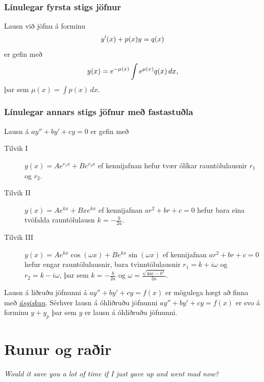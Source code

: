 \documentclass[b5paper,10pt,icelandic]{sphinxmanual}
\begin{document}
\subsection{Línulegar fyrsta stigs jöfnur}
\label{kafli08:linulegar-fyrsta-stigs-jofnur}
Lausn við jöfnu á forminu
\begin{gather}
\begin{split}y'(x) + p(x)y = q(x)\end{split}\notag
\end{gather}
er gefin með
\begin{gather}
\begin{split}y(x) = e^{-\mu(x)} \int e^{\mu(x)} q(x)\, dx,\end{split}\notag
\end{gather}
þar sem \(\mu(x) = \int p(x)\, dx\).


\subsection{Línulegar annars stigs jöfnur með fastastuðla}
\label{kafli08:linulegar-annars-stigs-jofnur-me-fastastula}
Lausn á \(ay''+by'+cy=0\) er gefin með
\begin{description}
\item[{Tilvik I}] \leavevmode
\(y(x)=Ae^{r_1x}+Be^{r_2x}\)
ef kennijafnan hefur tvær ólíkar rauntölulausnir \(r_1\) og
\(r_2\).

\item[{Tilvik II}] \leavevmode
\(y(x)=Ae^{kx}+Bxe^{kx}\)
ef kennijafnan \(ar^2+br+c=0\) hefur bara eina tvöfalda rauntölulausn
\(k=-\frac{b}{2a}\).

\item[{Tilvik III}] \leavevmode
\(y(x)=Ae^{kx}\cos(\omega x)+Be^{kx}\sin(\omega x)\)
ef kennijafnan \(ar^2+br+c=0\) hefur engar rauntölulausnir,
bara tvinntölulausnir \(r_1=k+i\omega\) og
\(r_2=k-i\omega\), þar sem
\(k=-\frac{b}{2a}\) og \(\omega=\frac{\sqrt{4ac-b^2}}{2a}\).

\end{description}

Lausn á liðruðu jöfnunni  á \(ay''+by'+cy=f(x)\) er mögulega hægt að finna
með {\hyperref[kafli08:agiskun]{\emph{ásgiskun}}}. Sérhver lausn á óhliðruðu jöfnunni \(ay''+by'+cy=f(x)\)
er svo á forminu \(y+y_p\) þar sem \(y\) er
lausn á óhliðruðu jöfnunni.


\chapter{Runur og raðir}
\label{kafli09:runur-og-rair}\label{kafli09::doc}
\emph{Would it save you a lot of time if I just gave up and went mad now?}
\end{document}
